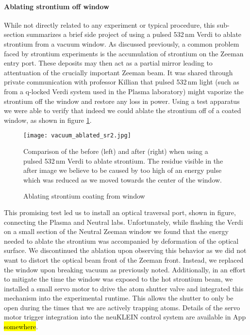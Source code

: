 \paragraph{Ablating strontium off window} \label{p:ablatingSr}
While not directly related to any experiment or typical procedure, this sub-section summarizes a brief side project of using a pulsed 532\,nm Verdi to ablate strontium from a vacuum window.
As discussed previously, a common problem faced by strontium experiments is the accumulation of strontium on the Zeeman entry port. 
These deposits may then act as a partial mirror leading to attentuation of the crucially important Zeeman beam. 
It was shared through private communication with professor Killian that pulsed 532\,nm light (such as from a q-locked Verdi system used in the Plasma laboratory) might vaporize the strontium off the window and restore any loss in power. 
Using a test apparatus we were able to verify that indeed we could ablate the strontium off of a coated window, as shown in figure \ref{fig:ablating_strontium}.
	\begin{figure}
		\centerline{
		\texttt{[image: vacuum\_ablated\_sr2.jpg]}}
		\caption{Ablating strontium coating from window}{Comparison of the before (left) and after (right) when using a pulsed 532\,nm Verdi to ablate strontium. The residue visible in the after image we believe to be caused by too high of an energy pulse which was reduced as we moved towards the center of the window.}
		\label{fig:ablating_strontium}
	\end{figure}
This promising test led us to install an optical traversal port, shown in figure, connecting the Plasma and Neutral labs. 
Unfortunately, while flashing the Verdi on a small section of the Neutral Zeeman window we found that the energy needed to ablate the strontium was accompanied by deformation of the optical surface.
We discontinued the ablation upon observing this behavior as we did not want to distort the optical beam front of the Zeeman front.
Instead, we replaced the window upon breaking vacuum as previously noted.
Additionally, in an effort to mitigate the time the window was exposed to the hot strontium beam, we installed a small servo motor to drive the atom shutter valve and integrated this mechanism into the experimental runtime. 
This allows the shutter to only be open during the times that we are actively trapping atoms. 
Details of the servo motor trigger integration into the neuKLEIN control system are available in App \hl{somewhere}.

